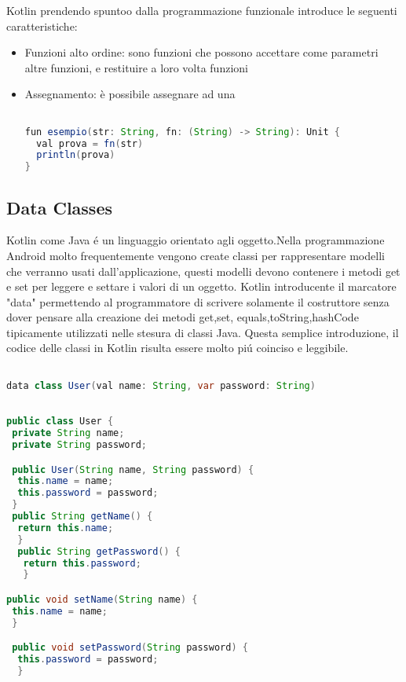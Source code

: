 Kotlin prendendo spuntoo dalla programmazione funzionale introduce le seguenti caratteristiche:


\begin{itemize}                         %

\item Funzioni alto ordine: sono funzioni che possono accettare come parametri altre funzioni, e restituire a loro volta funzioni

\item Assegnamento: è possibile assegnare ad una


\begin{lstlisting}[language=java,caption={Esempio Kotlin}]

fun esempio(str: String, fn: (String) -> String): Unit {
  val prova = fn(str)
  println(prova)
}
\end{lstlisting}




\end{itemize}




\subsection{Data Classes}
Kotlin come Java \'e un linguaggio orientato agli oggetto.Nella programmazione Android molto frequentemente vengono create classi per rappresentare modelli che verranno usati dall'applicazione, questi modelli devono contenere i metodi get e set per leggere e settare i valori di un oggetto.
Kotlin introducente il marcatore "data" permettendo al programmatore di scrivere solamente il costruttore senza dover pensare alla creazione dei metodi get,set, equals,toString,hashCode tipicamente utilizzati nelle stesura di classi Java.
Questa semplice introduzione, il codice delle classi in Kotlin risulta essere molto pi\'u coinciso e leggibile.

\begin{lstlisting}[language=java,caption={Esempio class Kotlin}]

data class User(val name: String, var password: String)
\end{lstlisting}

\begin{lstlisting}[language=java,caption={Esempio class Java}]

public class User {
 private String name;
 private String password;

 public User(String name, String password) {
  this.name = name;
  this.password = password;
 }
 public String getName() {
  return this.name;
  }
  public String getPassword() {
   return this.password;
   }

public void setName(String name) {
 this.name = name;
 }

 public void setPassword(String password) {
  this.password = password;
  }
    \end{lstlisting}


